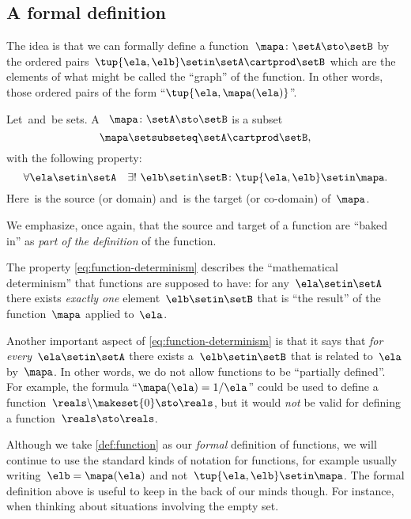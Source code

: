 \subsection{A formal definition}

The idea is that we can formally define a function~$\mapa\colon \setA \sto \setB$ by the ordered pairs~$\tup{\ela, \elb} \setin\setA \cartprod \setB$ which are the elements of what might be called the ``graph'' of the function.
In other words, those ordered pairs of the form ``$\tup{\ela, \mapa(\ela)}$''.

\begin{ctdefinition}[Function]
    \label{def:function}
    Let~\setA and~\setB be sets.
    A ~$\mapa\colon \setA \sto \setB$ is a subset
    \begin{equation}
        \mapa \setsubseteq \setA \cartprod \setB,
    \end{equation}
    with the following property:
    \begin{equation}
        \label{eq:function-determinism}
        \forall \ela \setin\setA \quad \exists !
        \ \elb \setin\setB \colon \tup{\ela,\elb} \setin\mapa.
    \end{equation}
    Here~\setA is the source (or domain) and~\setB is the target (or co-domain) of~$\mapa$.
\end{ctdefinition}

We emphasize, once again, that the source and target of a function are ``baked in'' as \emph{part of the definition} of the function.

The property \cref{eq:function-determinism} describes the ``mathematical determinism'' that functions are supposed to have: for any~$\ela \setin\setA$ there exists \emph{exactly one} element~$\elb \setin\setB$ that is ``the result'' of the function~$\mapa$ applied to~$\ela$.

Another important aspect of \cref{eq:function-determinism} is that it says that \emph{for every}~$\ela \setin\setA$ there exists a~$\elb \setin\setB$ that is related to~$\ela$ by~$\mapa$.
In other words, we do not allow functions to be ``partially defined''.
For example, the formula ``$\mapa(\ela) = 1/ \ela$'' could be used to define a function~$\reals \backslash \makeset{ 0 } \sto \reals$, but it would \emph{not} be valid for defining a function~$\reals \sto \reals$.

Although we take \cref{def:function} as our \emph{formal} definition of functions, we will continue to use the standard kinds of notation for functions, for example usually writing~$\elb = \mapa(\ela)$ and not~$\tup{\ela, \elb} \setin\mapa$.
The formal definition above is useful to keep in the back of our minds though.
For instance, when thinking about situations involving the empty set.

